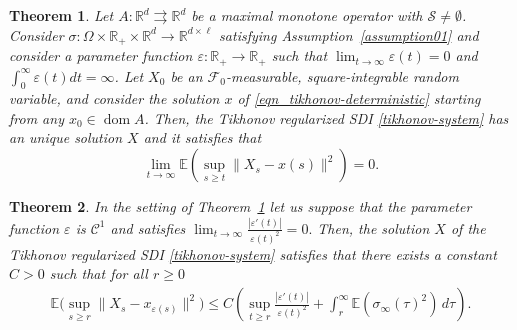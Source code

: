 \documentclass[10pt,a4paper]{amsart}
\newtheorem{theorem}{Theorem}
\newcommand{\R}{\mathbb{R}}
\newcommand{\dom}{\operatorname{dom}}
\renewcommand{\epsilon}{\varepsilon}
\begin{document}
\begin{theorem}\label{Main_resultTych}
  Let $A \colon \mathbb{R}^d \rightrightarrows \mathbb{R}^d$  be  a maximal monotone operator  with $\mathcal{S}\neq \emptyset$.  Consider $\sigma \colon \Omega \times  \R_+ \times \mathbb{R}^d \to \mathbb{R}^{d\times \ell}$  satisfying  Assumption~\ref{assumption01}  and consider a  parameter function $\epsilon : \mathbb{R}_+ \to \R_+ $
   such that $\lim_{t\to \infty}\epsilon(t) = 0$ and $\int_0^\infty\epsilon(t)dt = \infty$.   Let $X_0$ be an $\mathcal{F}_0$-measurable, square-integrable random variable, and consider  the solution $x$ of \eqref{eqn_tikhonov-deterministic} starting from any $x_0\in \dom A$.   Then, the  Tikhonov regularized SDI \eqref{tikhonov-system} has an unique solution $X$ and it satisfies that   $$\displaystyle\lim_{t\to \infty}\mathbb{E}(\sup_{s\geq t}\|X_s-x(s)\|^2) = 0.$$
\end{theorem}

\begin{theorem}\label{thm-tikhonov}
 In the setting of Theorem~\ref{Main_resultTych}  let us suppose that the parameter function $\epsilon$ is $\mathcal{C}^1$ and satisfies $\displaystyle\lim_{t\to \infty}  \frac{\left|\epsilon'(t) \right|}{\epsilon(t)^2} = 0.  $   Then, the   solution $X$ of the  Tikhonov regularized SDI \eqref{tikhonov-system} satisfies that there exists a constant $C >0$ such that for all $r \geq 0$
 \begin{align}\label{T01}
 \mathbb{E}\Big(\sup_{s\geq r}\|X_{s }-x_{\epsilon(s )}\|^2\Big) 
		\leq C \left( \sup_{t\geq r}\frac{|\epsilon'(t)|}{\epsilon(t)^2} + \int_{r}^\infty \mathbb{E}(\sigma_\infty(\tau)^2) \, d\tau \right).
 \end{align}
\end{theorem}
\end{document}
